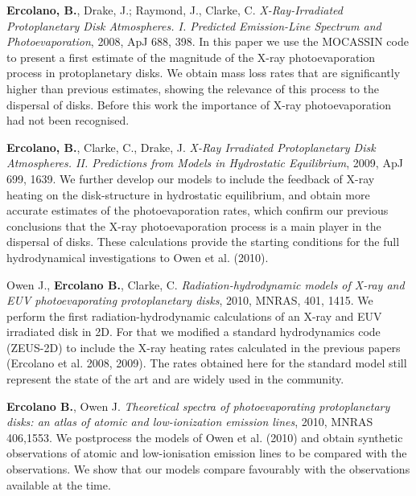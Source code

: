 \documentclass[10pt,fleqn,twoside]{article}
\begin{document}
\begin{literature}

\item \textbf{Ercolano, B.},  Drake, J.; Raymond, J., Clarke, C.
  \textit{X-Ray-Irradiated Protoplanetary Disk Atmospheres. I. Predicted Emission-Line Spectrum and Photoevaporation}, 2008, ApJ
  688, 398. In this paper we use the MOCASSIN code to present a first
  estimate of the magnitude of the X-ray photoevaporation process in
  protoplanetary disks. We obtain mass loss rates that are
  significantly higher than previous estimates, showing
  the relevance of this process to the dispersal of disks. Before this work the
  importance of X-ray photoevaporation had not been recognised.  

\item \textbf{Ercolano, B.}, Clarke, C., Drake, J. \textit{X-Ray
    Irradiated Protoplanetary Disk Atmospheres. II. Predictions from
    Models in Hydrostatic Equilibrium}, 2009, ApJ 699, 1639. We
  further develop our models to include the feedback of X-ray heating
  on the disk-structure in hydrostatic equilibrium, and obtain more
  accurate estimates of the photoevaporation rates, which confirm our
  previous conclusions that the X-ray photoevaporation process is a
  main player in the dispersal of disks. These calculations provide the
  starting conditions for the full hydrodynamical investigations to
  Owen et al. (2010).

\item Owen J., \textbf{Ercolano B.}, Clarke,
  C. \textit{Radiation-hydrodynamic models of X-ray and EUV
    photoevaporating protoplanetary disks}, 2010, MNRAS, 
  401, 1415. We perform the first radiation-hydrodynamic calculations
  of an X-ray and EUV irradiated disk in 2D. For that we modified a
  standard hydrodynamics code (ZEUS-2D) to include the X-ray heating
  rates calculated in the previous papers (Ercolano et al. 2008, 2009). The rates obtained here
  for the standard model still represent the state of the art and are
  widely used in the community. 

\item \textbf{Ercolano B.}, Owen J. {\em Theoretical spectra of
    photoevaporating protoplanetary disks: an atlas of atomic and
    low-ionization emission lines}, 2010, MNRAS 406,1553. We postprocess the
  models of Owen et al. (2010) and obtain synthetic observations of
  atomic and low-ionisation emission lines to be compared with the
  observations. We show that our models compare favourably with the
  observations available at the time.


\end{literature}
\end{document}
